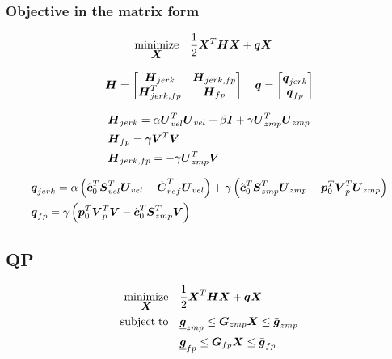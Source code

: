 \subsubsection{Objective in the matrix form}
\begin{equation*}
\begin{split}
    \minimize{\V{X}}    & \frac{1}{2} \V{X}^T\M{H}\V{X} + \V{q} \V{X}
\end{split}
\end{equation*}

\begin{equation*}
\M{H} = 
    \begin{bmatrix}
        \M{H}_{jerk}        &   \M{H}_{jerk,fp}\\
        \M{H}_{jerk,fp}^T   &   \M{H}_{fp}
    \end{bmatrix}
\quad
\V{q} = 
    \begin{bmatrix}
        \V{q}_{jerk}\\
        \V{q}_{fp}
    \end{bmatrix}
\end{equation*}

\begin{equation*}
\begin{split}
& \M{H}_{jerk} = 
    \alpha \M{U}_{vel}^T \M{U}_{vel} 
    + \beta \M{I}
    + \gamma \M{U}_{zmp}^T \M{U}_{zmp}\\
& \M{H}_{fp} = 
    \gamma \M{V}^T \M{V}\\
& \M{H}_{jerk,fp} = 
    - \gamma \M{U}_{zmp}^T \M{V}
\end{split}
\end{equation*}


\begin{equation*}
\begin{split}
& \V{q}_{jerk} = 
    \alpha 
    \left(
        \cstate_0^T \M{S}_{vel}^T \M{U}_{vel}
        -
        \cVel_{ref}^T \M{U}_{vel} 
    \right)
    + 
    \gamma 
    \left(
        \cstate_0^T \M{S}_{zmp}^T \M{U}_{zmp}
        - 
        \fp_0^T \M{V}_p^T \M{U}_{zmp} 
    \right)\\
& \V{q}_{fp} =
    \gamma 
    \left(
        \fp_0^T \M{V}_p^T \M{V}
        - 
        \cstate_0^T \M{S}_{zmp}^T \M{V}
    \right)
\end{split}
\end{equation*}


\subsection{QP}
\begin{equation*}
\begin{split}
    \minimize{\V{X}}    & \frac{1}{2} \V{X}^T\M{H}\V{X} + \V{q} \V{X}\\
    \subjectto          & \underline{\V{g}}_{zmp}  \le  \M{G}_{zmp} \V{X}  \le  \bar{\V{g}}_{zmp}\\
                        & \underline{\V{g}}_{fp}  \le  \M{G}_{fp} \V{X}  \le  \bar{\V{g}}_{fp}
\end{split}
\end{equation*}

